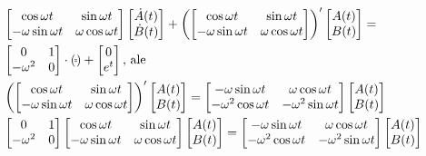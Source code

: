 \documentclass[../main.tex]{subfiles}
\begin{document}
\begin{przyklad}
\begin{align*}
                &\begin{bmatrix} \cos\omega t&\sin\omega t\\ -\omega \sin\omega t& \omega \cos\omega t \end{bmatrix} \begin{bmatrix} \dot{A}(t)\\ \dot{B}(t) \end{bmatrix} + \left( \begin{bmatrix} \cos\omega t & \sin\omega t\\ -\omega \sin\omega t & \omega \cos \omega t \end{bmatrix}  \right)'\begin{bmatrix} A(t)\\B(t) \end{bmatrix} = \\
                &\begin{bmatrix} 0&1\\-\omega^2&0 \end{bmatrix} \cdot (_{\tilde \tilde }) + \begin{bmatrix} 0\\e^t \end{bmatrix} \text{, ale }\\
                &\left( \begin{bmatrix} \cos\omega t&\sin\omega t\\ -\omega \sin\omega t & \omega \cos \omega t \end{bmatrix}  \right)' \begin{bmatrix} A(t)\\B(t) \end{bmatrix} = \begin{bmatrix} -\omega \sin\omega t & \omega \cos\omega t\\ -\omega^2\cos\omega t&-\omega^2\sin\omega t \end{bmatrix} \begin{bmatrix} A(t)\\B(t) \end{bmatrix}\\
                &\begin{bmatrix} 0&1\\-\omega^2&0 \end{bmatrix} \begin{bmatrix} \cos\omega t&\sin\omega t\\ -\omega \sin\omega t & \omega \cos\omega t \end{bmatrix} \begin{bmatrix} A(t)\\B(t) \end{bmatrix} = \begin{bmatrix} -\omega \sin\omega t & \omega \cos\omega t \\ -\omega^2\cos\omega t & -\omega^2 \sin\omega t \end{bmatrix}\begin{bmatrix} A(t)\\B(t) \end{bmatrix}\\

\end{align*}
\end{przyklad}
\end{document}
